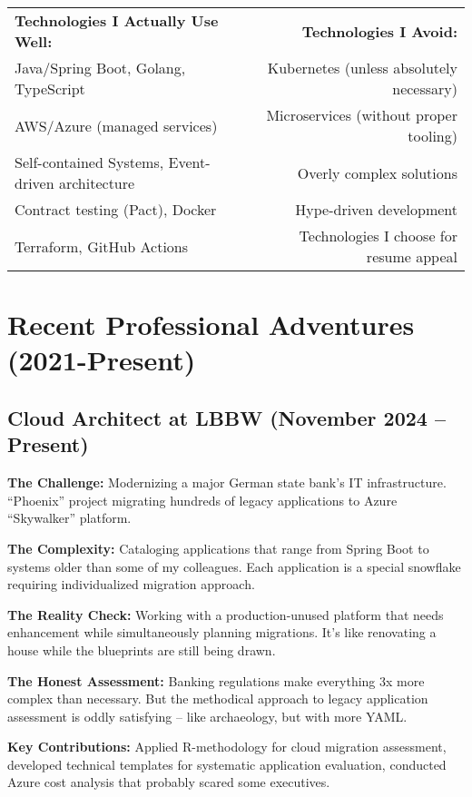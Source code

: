 \documentclass[11pt,a4paper]{article}
\begin{document}
\vspace{0.5em}

\begin{tabularx}{\textwidth}{Xr}
\textbf{Technologies I Actually Use Well:} & \textbf{Technologies I Avoid:} \\
Java/Spring Boot, Golang, TypeScript & Kubernetes (unless absolutely necessary) \\
AWS/Azure (managed services) & Microservices (without proper tooling) \\
Self-contained Systems, Event-driven architecture & Overly complex solutions \\
Contract testing (Pact), Docker & Hype-driven development \\
Terraform, GitHub Actions & Technologies I choose for resume appeal \\
\end{tabularx}

\newpage

\section{Recent Professional Adventures (2021-Present)}

\subsection{Cloud Architect at LBBW (November 2024 -- Present)}
\textbf{The Challenge:} Modernizing a major German state bank's IT infrastructure. ``Phoenix'' project migrating hundreds of legacy applications to Azure ``Skywalker'' platform.

\textbf{The Complexity:} Cataloging applications that range from Spring Boot to systems older than some of my colleagues. Each application is a special snowflake requiring individualized migration approach.

\textbf{The Reality Check:} Working with a production-unused platform that needs enhancement while simultaneously planning migrations. It's like renovating a house while the blueprints are still being drawn.

\textbf{The Honest Assessment:} Banking regulations make everything 3x more complex than necessary. But the methodical approach to legacy application assessment is oddly satisfying -- like archaeology, but with more YAML.

\textbf{Key Contributions:} Applied R-methodology for cloud migration assessment, developed technical templates for systematic application evaluation, conducted Azure cost analysis that probably scared some executives.
\end{document}
